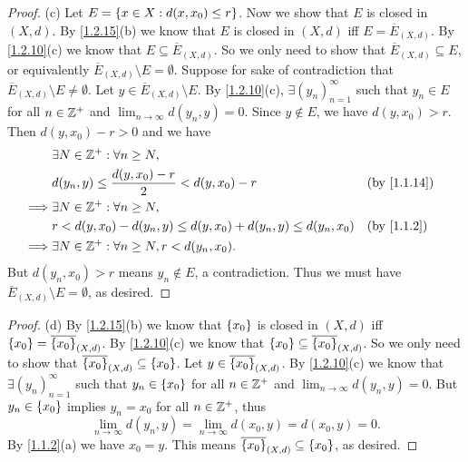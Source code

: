 \begin{proof}{(c)}
  Let \(E = \left\lbrace x \in X : d(x, x_0) \leq r\right\rbrace\).
  Now we show that \(E\) is closed in \((X, d)\).
  By \cref{1.2.15}(b) we know that \(E\) is closed in \((X, d)\) iff \(E = \overline{E}_{(X, d)}\).
  By \cref{1.2.10}(c) we know that \(E \subseteq \overline{E}_{(X, d)}\).
  So we only need to show that \(\overline{E}_{(X, d)} \subseteq E\), or equivalently \(\overline{E}_{(X, d)} \setminus E = \emptyset\).
  Suppose for sake of contradiction that \(\overline{E}_{(X, d)} \setminus E \neq \emptyset\).
  Let \(y \in \overline{E}_{(X, d)} \setminus E\).
  By \cref{1.2.10}(c), \(\exists (y_n)_{n = 1}^\infty\) such that \(y_n \in E\) for all \(n \in \mathbb{Z}^+\) and \(\lim_{n \to \infty} d(y_n, y) = 0\).
  Since \(y \notin E\), we have \(d(y, x_0) > r\).
  Then \(d(y, x_0) - r > 0\) and we have
  \begin{align*}
             & \exists N \in \Z^+ : \forall n \geq N,                                                 \\
             & d(y_n, y) \leq \dfrac{d(y, x_0) - r}{2} < d(y, x_0) - r               &  & \by{1.1.14} \\
    \implies & \exists N \in \Z^+ : \forall n \geq N,                                                 \\
             & r < d(y, x_0) - d(y_n, y) \leq d(y, x_0) + d(y_n, y) \leq d(y_n, x_0) &  & \by{1.1.2}  \\
    \implies & \exists N \in \Z^+ : \forall n \geq N, r < d(y_n, x_0).
  \end{align*}
  But \(d(y_n, x_0) > r\) means \(y_n \notin E\), a contradiction.
  Thus we must have \(\overline{E}_{(X, d)} \setminus E = \emptyset\), as desired.
\end{proof}

\begin{proof}{(d)}
  By \cref{1.2.15}(b) we know that \(\left\lbrace x_0\right\rbrace\) is closed in \((X, d)\) iff \(\left\lbrace x_0\right\rbrace = \overline{\left\lbrace x_0\right\rbrace}_{(X, d)}\).
  By \cref{1.2.10}(c) we know that \(\left\lbrace x_0\right\rbrace \subseteq \overline{\left\lbrace x_0\right\rbrace}_{(X, d)}\).
  So we only need to show that \(\overline{\left\lbrace x_0\right\rbrace}_{(X, d)} \subseteq \left\lbrace x_0\right\rbrace\).
  Let \(y \in \overline{\left\lbrace x_0\right\rbrace}_{(X, d)}\).
  By \cref{1.2.10}(c) we know that \(\exists (y_n)_{n = 1}^\infty\) such that \(y_n \in \left\lbrace x_0\right\rbrace\) for all \(n \in \mathbb{Z}^+\) and \(\lim_{n \to \infty} d(y_n, y) = 0\).
  But \(y_n \in \left\lbrace x_0\right\rbrace\) implies \(y_n = x_0\) for all \(n \in \mathbb{Z}^+\), thus
  \[
    \lim_{n \to \infty} d(y_n, y) = \lim_{n \to \infty} d(x_0, y) = d(x_0, y) = 0.
  \]
  By \cref{1.1.2}(a) we have \(x_0 = y\).
  This means \(\overline{\left\lbrace x_0\right\rbrace}_{(X, d)} \subseteq \left\lbrace x_0\right\rbrace\), as desired.
\end{proof}

